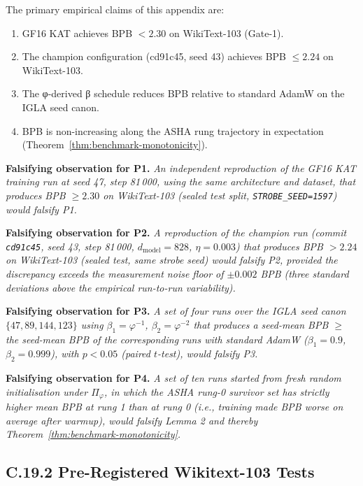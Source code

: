 The primary empirical claims of this appendix are:
\begin{enumerate}
  \item[P1.] GF16 KAT achieves BPB $< 2.30$ on WikiText-103 (Gate-1).
  \item[P2.] The champion configuration (cd91c45, seed 43) achieves
             BPB $\leq 2.24$ on WikiText-103.
  \item[P3.] The φ-derived β schedule reduces BPB relative to standard
             AdamW on the IGLA seed canon.
  \item[P4.] BPB is non-increasing along the ASHA rung trajectory in
             expectation (Theorem~\ref{thm:benchmark-monotonicity}).
\end{enumerate}

\noindent\textbf{Falsifying observation for P1.}
\emph{An independent reproduction of the GF16 KAT training run at
seed 47, step 81\,000, using the same architecture and dataset, that
produces BPB $\geq 2.30$ on WikiText-103 (sealed test split,
\texttt{STROBE\_SEED=1597}) would falsify P1.}

\noindent\textbf{Falsifying observation for P2.}
\emph{A reproduction of the champion run (commit \texttt{cd91c45},
seed 43, step 81\,000, $d_\text{model}=828$, $\eta=0.003$) that
produces BPB $> 2.24$ on WikiText-103 (sealed test, same strobe seed)
would falsify P2, provided the discrepancy exceeds the measurement
noise floor of $\pm 0.002$ BPB (three standard deviations above the
empirical run-to-run variability).}

\noindent\textbf{Falsifying observation for P3.}
\emph{A set of four runs over the IGLA seed canon $\{47,89,144,123\}$
using $\beta_1 = \varphi^{-1}$, $\beta_2 = \varphi^{-2}$ that
produces a seed-mean BPB $\geq$ the seed-mean BPB of the corresponding
runs with standard AdamW ($\beta_1=0.9$, $\beta_2=0.999$), with
$p < 0.05$ (paired $t$-test), would falsify P3.}

\noindent\textbf{Falsifying observation for P4.}
\emph{A set of ten runs started from fresh random initialisation under
$\Pi_\varphi$, in which the ASHA rung-0 survivor set has strictly
higher mean BPB at rung 1 than at rung 0 (i.e., training made BPB
worse on average after warmup), would falsify Lemma 2 and thereby
Theorem~\ref{thm:benchmark-monotonicity}.}

\subsection*{C.19.2 Pre-Registered Wikitext-103 Tests}

